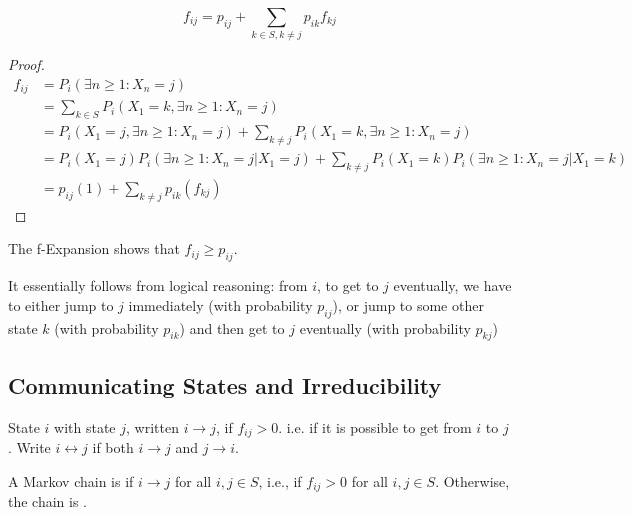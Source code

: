 \documentclass[11pt]{article}
\begin{document}
    \theorem[f-Expansion]
    $$f_{ij} = p_{ij} + \sum_{k \in S, k \neq j} p_{ik}f_{kj}$$
    \begin{proof}
    	\begin{align*}
    		f_{ij} &= P_i(\exists n \geq 1: X_n = j) \\
    		&= \sum_{k \in S} P_i(X_1 = k, \exists n \geq 1: X_n = j) \\
    		&= P_i(X_1 = j, \exists n \geq 1: X_n = j) + \sum_{k \neq j} P_i(X_1 = k, \exists n \geq 1: X_n = j) \\
    		&= P_i(X_1 = j)P_i(\exists n \geq 1: X_n = j | X_1 = j) + \sum_{k \neq j} P_i(X_1 = k)P_i( \exists n \geq 1: X_n = j | X_1 = k) \\
    		&= p_{ij}(1) + \sum_{k \neq j}p_{ik}(f_{kj})
    	\end{align*}
    \end{proof}
    
    \remark
    The f-Expansion shows that $f_{ij} \geq p_{ij}$.
    
    \remark
    It essentially follows from logical reasoning: from $i$, to get to $j$ eventually, we have to either jump to $j$ immediately (with probability $p_{ij}$), or jump to some other state $k$ (with probability $p_{ik}$) and then get to $j$ eventually (with probability $p_{kj}$)
    \subsection{Communicating States and Irreducibility}
     State $i$  with state $j$, written $i \rightarrow j$, if $f_{ij} > 0$.
    \remark
    i.e. if it is possible to get from $i$ to $j$.
    \notation
    Write $i \leftrightarrow j$ if both $i \rightarrow j$ and $j \rightarrow i$.
    
     A Markov chain is  if $i \rightarrow j$ for all $i, j \in S$, i.e., if $f_{ij} > 0$ for all $i, j \in S$. Otherwise, the chain is .
    
\end{document}

